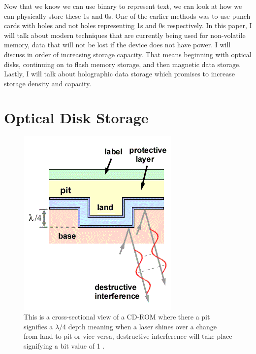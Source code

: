 \documentclass[ notitlepage, numerical, 11pt]{revtex4-1} %
\begin{document}
Now that we know we can use binary to represent text, we can look at how we can physically store these 1s and 0s. One of the earlier methods was to use punch cards with holes and not holes representing 1s and 0s respectively. In this paper, I will talk about modern techniques that are currently being used for non-volatile memory, data that will not be lost if the device does not have power. I will discuss in order of increasing storage capacity. That means beginning with optical disks, continuing on to flash memory storage, and then magnetic data storage. Lastly, I will talk about holographic data storage which promises to  increase storage density and capacity.





\section{Optical Disk Storage}
\begin{figure}[H]
\centerline{\includegraphics[scale=.9]{cdRom.png}}
\caption{ This is a cross-sectional view of a CD-ROM where there a pit signifies a $\lambda/4$ depth meaning when a laser shines over a change from land to pit or vice versa, destructive interference will take place signifying a bit value of 1 \cite{cdCross}.}
\label{cdRom}
\end{figure}
\end{document}
